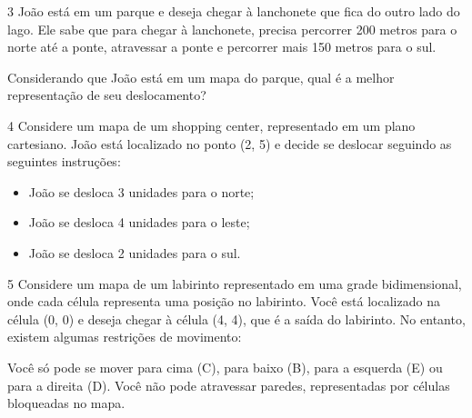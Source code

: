 
\num{3} João está em um parque e deseja chegar à lanchonete que fica do outro
lado do lago. Ele sabe que para chegar à lanchonete, precisa percorrer
200 metros para o norte até a ponte, atravessar a ponte e percorrer mais
150 metros para o sul.

Considerando que João está em um mapa do parque, qual é a melhor
representação de seu deslocamento?


\num{4} Considere um mapa de um shopping center, representado em um plano
cartesiano. João está localizado no ponto (2, 5) e decide se deslocar
seguindo as seguintes instruções:

\begin{itemize}
\item João se desloca 3 unidades para o norte; 
\item João se desloca 4 unidades para o leste; 
\item João se desloca 2 unidades para o sul.
\end{itemize}


\num{5} Considere um mapa de um labirinto representado em uma grade
bidimensional, onde cada célula representa uma posição no labirinto.
Você está localizado na célula (0, 0) e deseja chegar à célula (4, 4),
que é a saída do labirinto. No entanto, existem algumas restrições de
movimento:

Você só pode se mover para cima (C), para baixo (B), para a esquerda (E)
ou para a direita (D). Você não pode atravessar paredes, representadas
por células bloqueadas no mapa.

